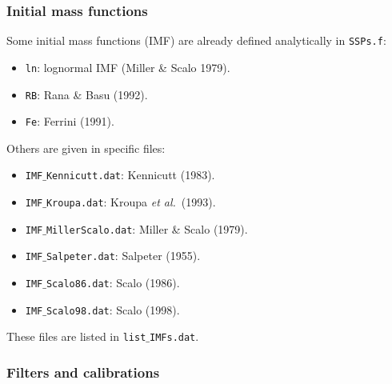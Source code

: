 \documentclass[11pt,draft,fleqn]{article}
\begin{document}
\subsubsection{Initial mass functions}
Some initial mass functions (IMF) are already defined analytically 
in \texttt{SSPs.f}: 
\begin{itemize}
\item \texttt{ln}: lognormal IMF (Miller \& Scalo 1979).
\item \texttt{RB}: Rana \& Basu (1992).
\item \texttt{Fe}: Ferrini (1991).
\end{itemize}
Others are given in specific files:
\begin{itemize}
\item \texttt{IMF$\_$Kennicutt.dat}: Kennicutt (1983).
\item \texttt{IMF$\_$Kroupa.dat}: Kroupa \emph{et al.}\ (1993).
\item \texttt{IMF$\_$MillerScalo.dat}: Miller \& Scalo (1979).
\item \texttt{IMF$\_$Salpeter.dat}: Salpeter (1955).
\item \texttt{IMF$\_$Scalo86.dat}: Scalo (1986).
\item \texttt{IMF$\_$Scalo98.dat}: Scalo (1998).
\end{itemize}
These files are listed in \texttt{list$\_$IMFs.dat}.
\subsubsection{Filters and calibrations}
\label{filters}
\end{document}
